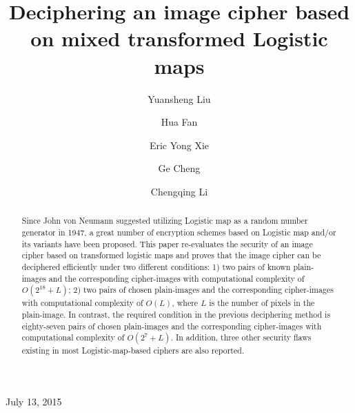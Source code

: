 \documentclass{ws-ijbc}
\begin{document}
\catchline{}{}{}{}{} 

\title{Deciphering an image cipher based on mixed transformed Logistic maps}

\author{Yuansheng Liu}
\address{College of Information Engineering,\\
 Xiangtan University, Xiangtan 411105, Hunan, China}

\author{Hua Fan}
\address{Information Security Certification Center, Beijing 100020, China}

\author{Eric Yong Xie}
\address{College of Information Engineering,\\
Xiangtan University, Xiangtan 411105, Hunan, China}

\author{Ge Cheng }
\address{School of Mathematics and Computational Science,\\
Xiangtan University, Xiangtan 411105, Hunan, China}

\author{Chengqing Li}
\address{College of Information Engineering,\\
 Xiangtan University, Xiangtan 411105, Hunan, China\\
 DrChengqingLi@gmail.com}

\maketitle

\begin{history}
July 13, 2015
\end{history}

\begin{abstract}
Since John von Neumann suggested utilizing Logistic map as a random number generator in 1947,
a great number of encryption schemes based on Logistic map and/or its variants have been proposed.
This paper re-evaluates the security of an image cipher based on transformed logistic maps and proves that
the image cipher can be deciphered efficiently under two different conditions:
1) two pairs of known plain-images and the corresponding cipher-images with computational complexity of $O(2^{18}+L)$;
2) two pairs of chosen plain-images and the corresponding cipher-images with computational complexity of $O(L)$, where $L$ is the number of pixels in the plain-image. In contrast, the required condition in the previous deciphering method is eighty-seven pairs of chosen plain-images and the corresponding cipher-images with computational complexity of $O(2^{7}+L)$. In addition, three other security flaws existing in most Logistic-map-based ciphers are also reported.
\end{abstract}
\end{document}
